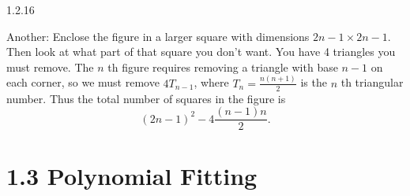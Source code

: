 \documentclass[11pt,]{book}
\theoremstyle{ptxplainnotitle}
\theoremstyle{ptxplaintitle}
\theoremstyle{ptxdefinitionnotitle}
\theoremstyle{ptxdefinitiontitle}
\theoremstyle{ptxdefinitionnotitle}
\theoremstyle{ptxdefinitiontitle}
\theoremstyle{ptxdefinitionnotitle}
\theoremstyle{ptxdefinitiontitle}
\theoremstyle{ptxdefinitiontitlenonumber}
\theoremstyle{ptxdefinitiontitlenonumber}
\numberwithin{equation}{chapter}
\begin{document}
\begin{divisionexercise}{1.2.16}
\begin{enumerate}[label=(\alph*)]
\par
\hypertarget{p-341}{}%
Another: Enclose the figure in a larger square with dimensions \(2n-1 \times 2n-1\).  Then look at what part of that square you don't want.  You have 4 triangles you must remove.  The \(n\) th figure requires removing a triangle with base \(n-1\) on each corner, so we must remove \(4T_{n-1}\), where \(T_n = \frac{n(n+1)}{2}\) is the \(n\) th triangular number.  Thus the total number of squares in the figure is%
\begin{equation*}
(2n-1)^2 - 4\frac{(n-1)n}{2}.
\end{equation*}
%
\end{enumerate}
%
\end{divisionexercise}%
\section*{1.3 Polynomial Fitting}
\end{document}
